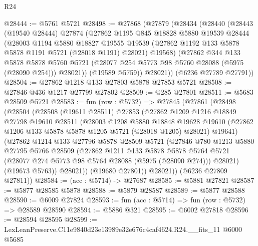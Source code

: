 \begin{lexlean}{R24}
\begin{coremodule}
@28444 := @5761 @5721
@28498 := @27868
    (@27879
      (@28434
        (@28440
          (@28443
            (@19540 @28444)
            @27874
            (@27862
              @1195
              @845
              @18828
              @5880
              @19539
              @28444
              (@28003
                @1194
                @5880
                @18827
                @19555
                @19539
                (@27862 @1192 @133 @5878 @5878 @1191 @5721 (@28018 @1191) @28021)
                @19568)
              (@27862
                @344
                @133
                @5878
                @5878
                @5760
                @5721
                (@28077 @254 @5773 @98 @5760 @28088 (@5975 (@28090 @254)))
                @28021))
            (@19589 @5759))
          @28021))
      (@6236 @27789 @27791))
@28504 := @27862 @1218 @133 @27803 @5878 @27853 @5721
@28508 := @27846 @436 @1217 @27799 @27802
@28509 := @285 @27801
@28511 := @5683 @28509 @5721
@28583 := fun (row : @5732) =>
  @27845
    (@27861
      (@28498
        (@28504
          (@28508
            (@19611 @28511)
            @27853
            (@27862
              @1209
              @1216
              @18849
              @27798
              @19610
              @28511
              (@28003
                @1208
                @5880
                @18848
                @19628
                @19610
                (@27862 @1206 @133 @5878 @5878 @1205 @5721 (@28018 @1205) @28021)
                @19641)
              (@27862
                @1214
                @133
                @27796
                @5878
                @28509
                @5721
                (@27846
                  @780
                  @1213
                  @5880
                  @27795
                  @5766
                  @28509
                  (@27862
                    @1211
                    @133
                    @5878
                    @5878
                    @5764
                    @5721
                    (@28077 @274 @5773 @98 @5764 @28088 (@5975 (@28090 @274)))
                    @28021)
                  (@19673 @5763))
                @28021))
            (@19680 @27801))
          @28021))
      (@6236 @27809 @27811))
@28584 := (acc : @5714) -> @27687
@28585 := @5881 @27821
@28587 := @5877 @28585 @5878
@28588 := @5879 @28587
@28589 := @5877 @28588
@28590 := @6009 @27824
@28593 := fun (acc : @5714) => fun (row : @5732) => @28589 @28590
@28594 := @5886 @321
@28595 := @6002 @27818
@28596 := @28594 @28595
@28599 := LexLeanPreserve.C11e9840d23e13989e32e676c4caf4624.R24.__fits_11 @6000 @5685

\end{coremodule}
\end{lexlean}
